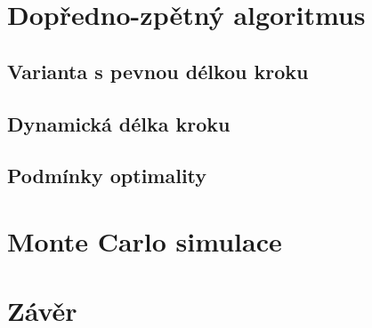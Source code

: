 \documentclass[FM,BP]{tulthesis}
\begin{document}
\chapter{Dopředno-zpětný algoritmus}

\section{Varianta s pevnou délkou kroku}

\section{Dynamická délka kroku}

\section{Podmínky optimality}

\chapter{Monte Carlo simulace}

\chapter{Závěr}

\renewcommand{\bibname}{Seznam použité literatury}
\begin{thebibliography}{99}
\end{thebibliography}
\end{document}
